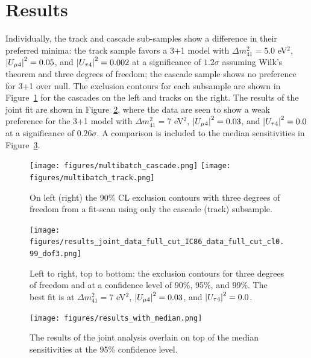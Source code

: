 \documentclass[main.tex]{subfiles}
\begin{document}
\section{Results}

Individually, the track and cascade sub-samples show a difference in their preferred minima: the track sample favors a 3+1 model with $\Delta m_{41}^{2}=5.0$ eV$^{2}$, $\left| U_{\mu 4} \right|^{2}=0.05$, and $\left| U_{\tau 4} \right|^{2}=0.002$ at a significance of $1.2\sigma$ assuming Wilk's theorem and three degrees of freedom; the cascade sample shows no preference for 3+1 over null.
The exclusion contours for each subsample are shown in Figure~\ref{fig:results_separate} for the cascades on the left and tracks on the right. 
The results of the joint fit are shown in Figure~\ref{fig:final_results}, where the data are seen to show a weak preference for the 3+1 model with $\Delta m_{41}^{2}=7$ eV$^{2}$, $\left| U_{\mu 4} \right|^{2}=0.03$, and $\left| U_{\tau 4} \right|^{2}=0.0$ at a significance of $0.26 \sigma$. 
A comparison is included to the median sensitivities in Figure~\ref{fig:final_results_median}.

\begin{figure}
    \centering
    \texttt{[image: figures/multibatch\_cascade.png]}%
    \texttt{[image: figures/multibatch\_track.png]}
    \caption{On left (right) the 90\% CL exclusion contours with three degrees of freedom from a fit-scan using only the cascade (track) subsample.}\label{fig:results_separate}
\end{figure}

\begin{figure}
    \centering
    \texttt{[image: figures/results\_joint\_data\_full\_cut\_IC86\_data\_full\_cut\_cl0.99\_dof3.png]}
    \caption{Left to right, top to bottom: the exclusion contours for three degrees of freedom and at a confidence level of 90\%, 95\%, and 99\%. The best fit is at $\Delta m_{41}^{2}=7$ eV$^{2}$, $\left| U_{\mu 4} \right|^{2}=0.03$, and $\left| U_{\tau 4} \right|^{2}=0.0$.}\label{fig:final_results}
\end{figure}

\begin{figure}
    \centering
    \texttt{[image: figures/results\_with\_median.png]}
    \caption{The results of the joint analysis overlain on top of the median sensitivities at the 95\% confidence level.}\label{fig:final_results_median}
\end{figure}
\end{document}
